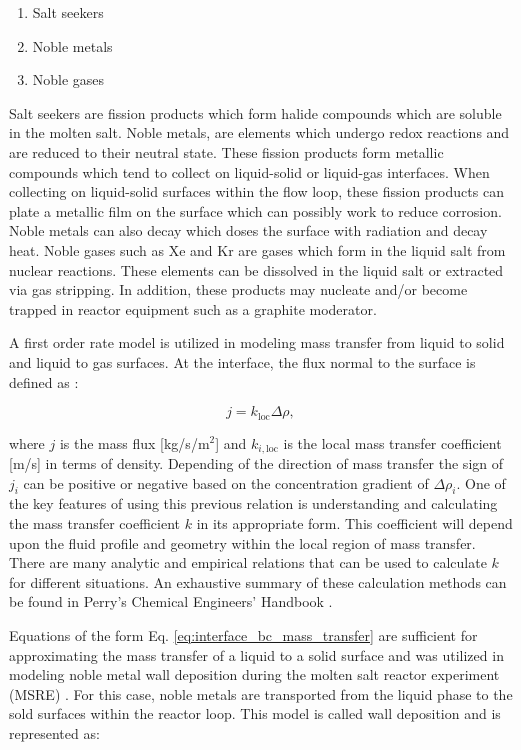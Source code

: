 \begin{enumerate}
    \item Salt seekers
    \item Noble metals
    \item Noble gases
\end{enumerate}

\noindent Salt seekers are fission products which form halide compounds which are soluble in the molten salt. Noble metals, are elements which undergo redox reactions and are reduced to their neutral state. These fission products form metallic compounds which tend to collect on liquid-solid or liquid-gas interfaces. When collecting on liquid-solid surfaces within the flow loop, these fission products can plate a metallic film on the surface which can possibly work to reduce corrosion. Noble metals can also decay which doses the surface with radiation and decay heat. Noble gases such as Xe and Kr are gases which form in the liquid salt from nuclear reactions. These elements can be dissolved in the liquid salt or extracted via gas stripping. In addition, these products may nucleate and/or become trapped in reactor equipment such as a graphite moderator. 

A first order rate model is utilized in modeling mass transfer from liquid to solid and liquid to gas surfaces. At the interface, the flux normal to the surface is defined as \cite{bird2006}:

\begin{equation}
    j = k_{\text{loc}} \Delta \rho,
    \label{eq:interface_bc_mass_transfer}
\end{equation}

\noindent where $j$ is the mass flux [kg/s/m$^{2}$] and $k_{i, \text{loc}}$ is the local mass transfer coefficient [m/s] in terms of density. Depending of the direction of mass transfer the sign of $j_{i}$ can be positive or negative based on the concentration gradient of $\Delta \rho_{i}$. One of the key features of using this previous relation is understanding and calculating the mass transfer coefficient $k$ in its appropriate form. This coefficient will depend upon the fluid profile and geometry within the local region of mass transfer. There are many analytic and empirical relations that can be used to calculate $k$ for different situations. An exhaustive summary of these calculation methods can be found in Perry's Chemical Engineers' Handbook \cite{perry2007}.

Equations of the form Eq. \ref{eq:interface_bc_mass_transfer} are sufficient for approximating the mass transfer of a liquid to a solid surface and was utilized in modeling noble metal wall deposition during the molten salt reactor experiment (MSRE) \cite{kedl1972}. For this case, noble metals are transported from the liquid phase to the sold surfaces within the reactor loop. This model is called wall deposition and is represented as:

